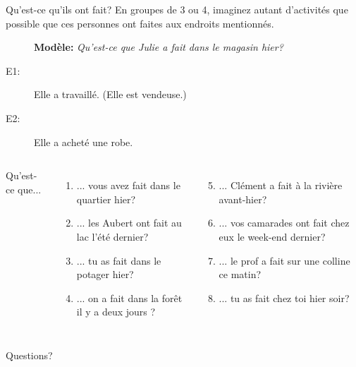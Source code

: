 \documentclass{beamer}
\begin{document}
  \begin{frame}{Qu'est-ce qu'ils ont fait?}
    En groupes de 3 ou 4, imaginez autant d'activités que possible que ces personnes ont faites aux endroits mentionnés.
    \begin{description}
      \item[] \textbf{Modèle:} \emph{Qu'est-ce que Julie a fait dans le magasin hier?}
      \item[E1:] Elle a travaillé. (Elle est vendeuse.)
      \item[E2:] Elle a acheté une robe.
    \end{description}
    \begin{columns}[t]
        Qu'est-ce que...
        \begin{enumerate}
          \item ... vous avez fait dans le quartier hier?
          \item ... les Aubert ont fait au lac l'été dernier?
          \item ... tu as fait dans le potager hier?
          \item ... on a fait dans la forêt il y a deux jours ?
        \end{enumerate}
        \begin{enumerate}
          \setcounter{enumi}{4}
          \item ... Clément a fait à la rivière avant-hier?
          \item ... vos camarades ont fait chez eux le week-end dernier?
          \item ... le prof a fait sur une colline ce matin?
          \item ... tu as fait chez toi hier soir?
        \end{enumerate}
    \end{columns}
  \end{frame}

  \begin{frame}{}
    \begin{center}
      \Large Questions?
    \end{center}
  \end{frame}
\end{document}
